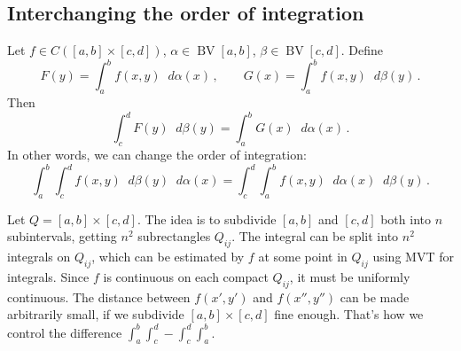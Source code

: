 \documentclass{article}
\newcommand{\dd}{\mathop{}\!d}
\DeclareMathOperator{\BV}{BV}
\begin{document}
\subsection{Interchanging the order of integration}
\begin{theorem}
    Let $ f \in C([a, b] \times [c, d]) $, $ \alpha \in \BV[a, b] $, $ \beta \in \BV[c, d] $. Define
    \[ 
        F(y) = \int_a^b f(x, y) \dd \alpha(x) \,, \qquad G(x) = \int_a^b f(x, y) \dd \beta(y) \,.
    \]
    Then
    \[ 
        \int_c^d F(y) \dd \beta(y) = \int_a^b G(x) \dd \alpha(x) \,.
    \]
    In other words, we can change the order of integration:
    \[ 
        \int_a^b \int_c^d f(x, y) \dd \beta(y) \dd \alpha(x) = \int_c^d \int_a^b f(x, y) \dd \alpha(x) \dd \beta(y) \,.
    \]
\end{theorem}

Let $ Q = [a, b] \times [c, d] $. The idea is to subdivide $ [a, b] $ and $ [c, d] $ both into $ n $ subintervals, getting $ n^2 $ subrectangles $ Q_{ij} $. The integral can be split into $ n^2 $ integrals on $ Q_{ij} $, which can be estimated by $ f $ at some point in $ Q_{ij} $ using MVT for integrals.  Since $ f $ is continuous on each compact $ Q_{ij} $, it must be uniformly continuous. The distance between $ f(x', y') $ and $ f(x'', y'') $ can be made arbitrarily small, if we subdivide $ [a, b] \times [c, d] $ fine enough. That's how we control the difference $ \int_a^b \int_c^d - \int_c^d \int_a^b $.
\end{document}
